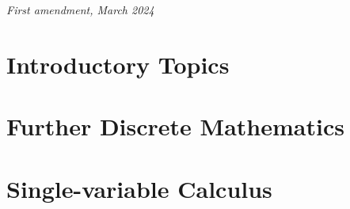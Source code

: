 \documentclass[
	12pt, %
	fleqn, %
	a4paper, %
]{LegrandOrangeBook}
\begin{document}
\noindent \textit{First amendment, March 2024} %


\pagestyle{empty} %

\tableofcontents %

\listoffigures %

\listoftables %

\pagestyle{fancy} %

\cleardoublepage %


\part{Introductory Topics}






\part{Further Discrete Mathematics}




\part{Single-variable Calculus}







\end{document}
